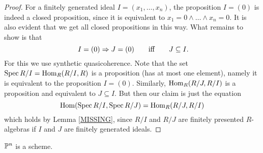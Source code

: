 \documentclass{zariski}
\begin{document}
\begin{proof}
  For a finitely generated ideal $I = (x_1, \dots, x_n)$,
  the proposition $I = (0)$ is indeed a closed proposition,
  since it is equivalent to $x_1 = 0 \land \dots \land x_n = 0$.
  It is also evident that we get all closed propositions in this way.
  What remains to show is that
  \[ I = (0) \Rightarrow J = (0)
     \qquad\text{iff}\qquad
     J \subseteq I
     \rlap{\text{.}}
  \]
  For this we use synthetic quasicoherence.
  Note that the set $\operatorname{Spec} R/I = \mathrm{Hom}_R(R/I, R)$ is a proposition
  (has at most one element),
  namely it is equivalent to the proposition $I = (0)$.
  Similarly, $\mathrm{Hom}_R(R/J, R/I)$ is a proposition
  and equivalent to $J \subseteq I$.
  But then our claim is just the equation
  \[ \mathrm{Hom}(\operatorname{Spec} R/I, \operatorname{Spec} R/J) = \mathrm{Hom}_R(R/J, R/I) \]
  which holds by Lemma \ref{MISSING},
  since $R/I$ and $R/J$ are finitely presented $R$-algebras
  if $I$ and $J$ are finitely generated ideals.
\end{proof}

\begin{theorem}
  $\mathbb{P}^n$ is a scheme.
\end{theorem}

\end{document}
